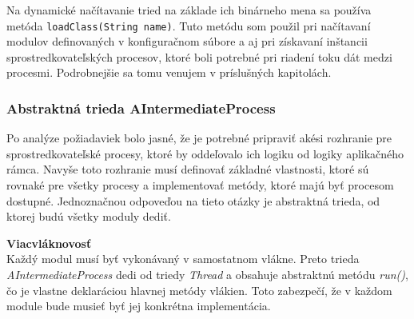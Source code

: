 Na dynamické načítavanie tried na základe ich binárneho mena sa používa metóda \verb|loadClass(String name)|.
Tuto metódu som použil pri načítavaní modulov definovaných v konfiguračnom súbore a aj pri získavaní 
inštancii sprostredkovateľských procesov, ktoré boli potrebné pri riadení toku dát medzi procesmi.
Podrobnejšie sa tomu venujem v príslušných kapitolách. 



\subsubsection{Abstraktná trieda AIntermediateProcess} 

Po analýze požiadaviek bolo jasné, že je potrebné pripraviť akési rozhranie pre sprostredkovateľské 
procesy, ktoré by oddeľovalo ich logiku od logiky aplikačného rámca. Navyše toto rozhranie musí 
definovať základné vlastnosti, ktoré sú rovnaké pre všetky procesy a implementovať metódy, ktoré 
majú byť procesom dostupné. Jednoznačnou odpoveďou na tieto otázky je abstraktná trieda, 
od ktorej budú všetky moduly dediť. 


\textbf{Viacvláknovosť} \\
Každý modul musí byť vykonávaný v samostatnom vlákne. Preto trieda \emph{AIntermediateProcess} dedi
od triedy \emph{Thread} a obsahuje abstraktnú metódu \emph{run()}, čo je vlastne deklaráciou 
hlavnej metódy vlákien. Toto zabezpečí, že v každom module bude musieť byť jej konkrétna implementácia.


